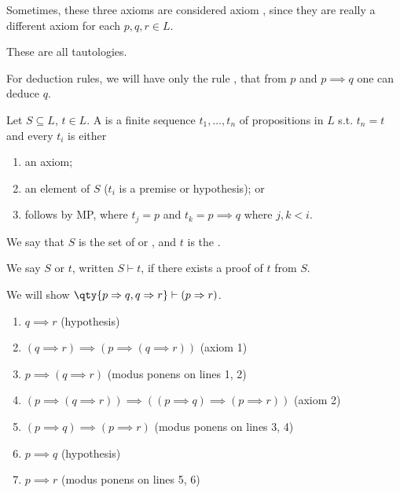 \begin{remark}
    Sometimes, these three axioms are considered axiom , since they are really a different axiom for each $p, q, r \in L$.

    These are all tautologies.
\end{remark}
For deduction rules, we will have only the rule , that from $p$ and $p \implies q$ one can deduce $q$.

\begin{definition}[Proof]
    Let $S \subseteq L$, $t \in L$.
    A  is a finite sequence $t_1, \dots, t_n$ of propositions in $L$ s.t. $t_n = t$ and every $t_i$ is either
    \begin{enumerate}
        \item an axiom;
        \item an element of $S$ ($t_i$ is a premise or hypothesis); or
        \item follows by MP, where $t_j = p$ and $t_k = p \implies q$ where $j, k < i$.
    \end{enumerate}
    We say that $S$ is the set of  or , and $t$ is the .

    We say $S$  or  $t$, written $S \vdash t$, if there exists a proof of $t$ from $S$.
\end{definition}

\begin{example}
    We will show $\qty{p \implies q, q \implies r} \vdash (p \implies r)$.
    \begin{enumerate}
        \item $q \implies r$ (hypothesis)
        \item $(q \implies r) \implies (p \implies (q \implies r))$ (axiom 1)
        \item $p \implies (q \implies r)$ (modus ponens on lines 1, 2)
        \item $(p \implies (q \implies r)) \implies ((p \implies q) \implies (p \implies r))$ (axiom 2)
        \item $(p \implies q) \implies (p \implies r)$ (modus ponens on lines 3, 4)
        \item $p \implies q$ (hypothesis)
        \item $p \implies r$ (modus ponens on lines 5, 6)
    \end{enumerate}
\end{example}

